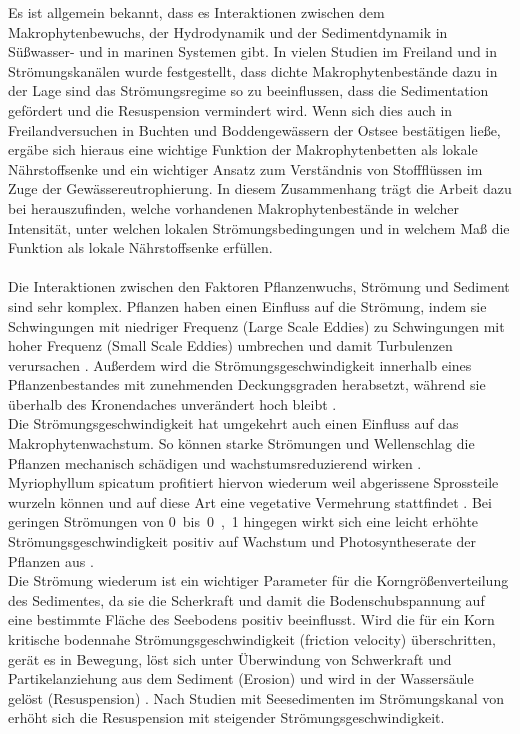 Es ist allgemein bekannt, dass es Interaktionen zwischen dem Makrophytenbewuchs, der Hydrodynamik und der Sedimentdynamik in Süßwasser- und in marinen Systemen gibt. In vielen Studien im Freiland und in Strömungskanälen wurde festgestellt, dass dichte Makrophytenbestände dazu in der Lage sind das Strömungsregime so zu beeinflussen, dass die Sedimentation gefördert und die Resuspension vermindert wird. Wenn sich dies auch in Freilandversuchen in Buchten und Boddengewässern der Ostsee bestätigen ließe, ergäbe sich hieraus eine wichtige Funktion der Makrophytenbetten als lokale Nährstoffsenke und ein wichtiger Ansatz zum Verständnis von Stoffflüssen im Zuge der Gewässereutrophierung. In diesem Zusammenhang trägt die Arbeit dazu bei herauszufinden, welche vorhandenen Makrophytenbestände in welcher Intensität, unter welchen lokalen Strömungsbedingungen und in welchem Maß die Funktion als lokale Nährstoffsenke erfüllen.\\
\\
Die Interaktionen zwischen den Faktoren Pflanzenwuchs, Strömung und Sediment sind sehr komplex. Pflanzen haben einen Einfluss auf die Strömung, indem sie Schwingungen mit niedriger Frequenz (Large Scale Eddies) zu Schwingungen mit hoher Frequenz (Small Scale Eddies) umbrechen und damit Turbulenzen verursachen \citep{leonard_2006}. Außerdem wird die Strömungsgeschwindigkeit innerhalb eines Pflanzenbestandes mit zunehmenden Deckungsgraden herabsetzt, während sie überhalb des Kronendaches unverändert hoch bleibt \citep{li_2014}.\\
Die Strömungsgeschwindigkeit hat umgekehrt auch einen Einfluss auf das Makrophytenwachstum. So können starke Strömungen und Wellenschlag die Pflanzen mechanisch schädigen und wachstumsreduzierend wirken \citep{biggs_1996}. Myriophyllum spicatum profitiert hiervon wiederum weil abgerissene Sprossteile wurzeln können und auf diese Art eine vegetative Vermehrung stattfindet \citep{madsen_1997}. Bei geringen Strömungen von \unit{0 bis 0,1}{\metre\per\second} hingegen wirkt sich eine leicht erhöhte Strömungsgeschwindigkeit positiv auf Wachstum und Photosyntheserate der Pflanzen aus \citep{madsen_1983}.\\ 
Die Strömung wiederum ist ein wichtiger Parameter für die Korngrößenverteilung des Sedimentes, da sie die Scherkraft und damit die Bodenschubspannung auf eine bestimmte Fläche des Seebodens positiv beeinflusst. Wird die für ein Korn kritische bodennahe Strömungsgeschwindigkeit (friction velocity) überschritten, gerät es in Bewegung, löst sich unter Überwindung von Schwerkraft und Partikelanziehung aus dem Sediment (Erosion) und wird in der Wassersäule gelöst (Resuspension) \citep{madsen_2001}. Nach Studien mit Seesedimenten im Strömungskanal von \cite{hu_2011} erhöht sich die Resuspension mit steigender Strömungsgeschwindigkeit. 
